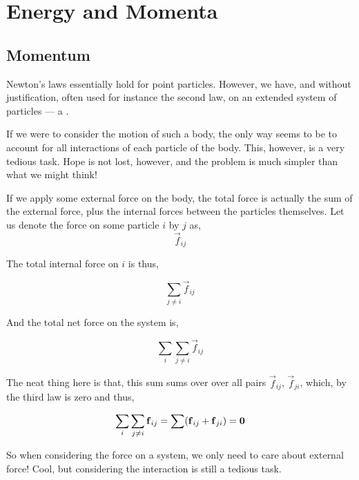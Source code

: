 \chapter{Energy and Momenta}


\section{Momentum}

Newton's laws essentially hold for point particles. However, we have, and without 
justification, often used for instance the second law, on an extended system of particles ---
a .

If we were to consider the motion of such a body, the only way seems to be 
to account for all interactions of each particle of the body. This, however, is a very tedious task.
Hope is not lost, however, and the problem is much simpler than what we might think!

If we apply some external force on the body, the total force is actually the sum of the external 
force, plus the internal forces between the particles themselves. Let us denote 
the force on some particle \(i\) by \(j\) as,
\[\vec{f}_{ij}\]


The total internal force on \(i\) is thus, 

\[\sum_{j \ne i} \vec{f}_{ij}\]

And the total net force on the system is,

\[\sum_{i}\sum_{j \ne i} \vec{f}_{ij}\]

The neat thing here is that, this sum sums over over all pairs \(\vec{f}_{ij}\), \(\vec{f}_{ji}\), which, by 
the third law is zero and thus, 

\begin{equation}
    \sum_{i}\sum_{j \ne i} \boldsymbol{\mathbf{f}}_{ij} = \sum (\boldsymbol{\mathbf{f}}_{ij} + \boldsymbol{\mathbf{f}}_{ji}) = \boldsymbol{\mathbf{0}}
\end{equation}

So when considering the force on a system, we only need to care about external force! Cool, 
but considering the interaction is still a tedious task. 

